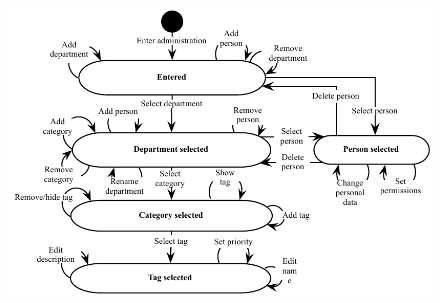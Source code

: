 \begin{figure}[h]
\begin{center}
 \includegraphics[scale=0.8]{input/application_domain_analysis/admin_use_case}
\label{fig:use_case_diagram}
\end{center}
\end{figure}
